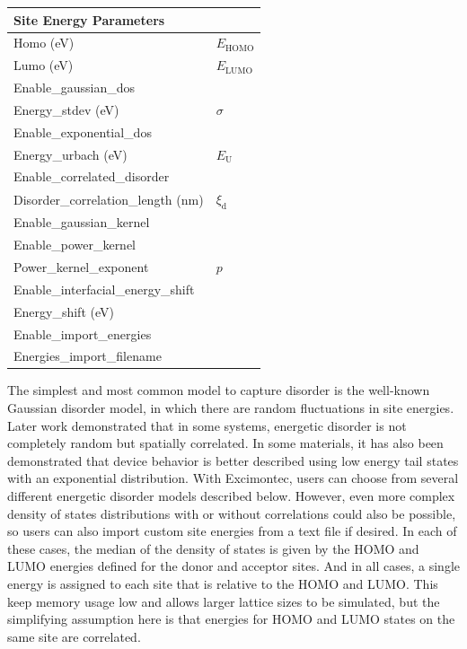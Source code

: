 \documentclass[%
 reprint,onecolumn,notitlepage,
superscriptaddress,longbibliography,
 amsmath,amssymb,
 aps,rmp,floatfix,
]{revtex4-1}
\begin{document}
\begin{center}
\begin{tabular}{ l l }
\hline
Site Energy Parameters & \\
\hline
Homo (eV) & $E_\text{HOMO}$ \\
Lumo (eV) & $E_\text{LUMO}$  \\
Enable\_gaussian\_dos & \\
Energy\_stdev (eV) & $\sigma$ \\
Enable\_exponential\_dos & \\
Energy\_urbach (eV) & $E_\text{U}$ \\
Enable\_correlated\_disorder & \\
Disorder\_correlation\_length (nm) & $\xi_\text{d}$ \\ 
Enable\_gaussian\_kernel & \\
Enable\_power\_kernel & \\
Power\_kernel\_exponent & $p$ \\
Enable\_interfacial\_energy\_shift & \\
Energy\_shift (eV) & \\
Enable\_import\_energies & \\
Energies\_import\_filename & \\
\end{tabular}
\end{center}

The simplest and most common model to capture disorder is the well-known Gaussian disorder model, in which there are random fluctuations in site energies.\cite{baessler1993pssb}
Later work demonstrated that in some systems, energetic disorder is not completely random but spatially correlated.\cite{gartstein1995cpl,novikov1998prl}
In some materials, it has also been demonstrated that device behavior is better described using low energy tail states with an exponential distribution.\cite{vissenberg1998prb,nelson2003prb,mackenzie2011jpcc}
With Excimontec, users can choose from several different energetic disorder models described below.
However, even more complex density of states distributions with or without correlations could also be possible, so users can also import custom site energies from a text file if desired.
In each of these cases, the median of the density of states is given by the HOMO and LUMO energies defined for the donor and acceptor sites. 
And in all cases, a single energy is assigned to each site that is relative to the HOMO and LUMO.
This keep memory usage low and allows larger lattice sizes to be simulated, but the simplifying assumption here is that energies for HOMO and LUMO states on the same site are correlated.
\end{document}
